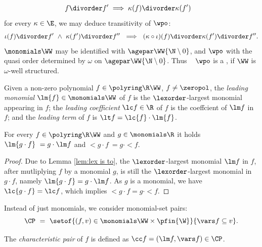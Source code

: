 \begin{align*}
f\divorder f' & \implies \kappa(f)\divorder\kappa(f') %
\end{align*}
for every $\kappa \in \E$,
we may deduce transitivity of $\wpo$: %
\[
\iota(f) \divorder f' \ \wedge \ 
\kappa(f') \divorder f'' \ \implies \ 
(\kappa\circ\iota)(f) \divorder \kappa(f') \divorder f''.
\]
$\monomials \WW$ may be identified with $\agepar \WW {\N\setminus 0}$, and $\wpo$ with the 
quasi order determined by $\omega$ on 
$\agepar \WW {\N\setminus 0}$.
Thus 
%
~%
$\wpo$ is a \wqo, if $\WW$ is $\omega$-well structured.
%
%
\begin{definition}%
\label{def:lm} 
\rm
Given a non-zero polynomial $f \in \polyring \R \WW$, $f\neq\zeropol$, the \emph{leading monomial} 
$\lm{f} \in \monomials \WW$ of $f$
is the $\lexorder$-largest monomial appearing in $f$;
the \emph{leading coefficient} $\lc f\in \R$ of $f$ is the coeffcient of $\lm f$ in $f$; and
the \emph{leading term} of $f$ is $\lt f = \lc{f} \cdot \lm{f}$.
\end{definition}
%
\begin{lemmarep} \label{lem:ltcdot}
For every  $f\in\polyring \R \WW$ and $g\in\monomials \R$ it holds
$\lm{g \cdot f} \ = g\cdot \lm f$ and
$\lt{g \cdot f} \ = g\cdot \lt f$.
\end{lemmarep}
%
%
\begin{proof}
Due to Lemma \ref{lem:lex is to}, the $\lexorder$-largest monomial
$\lm f$ in $f$, after mutliplying $f$ by a monomial $g$, is still the $\lexorder$-largest
monomial in $g\cdot f$, namely $\lm {g\cdot f} = g\cdot \lm f$.
As $g$ is a monomial, we have $\lc {g\cdot f} = \lc f$, which implies
$\lt {g\cdot f} = g\cdot \lt f$.
\end{proof}

Instead of just monomials, we consider monomial-set pairs:
\[
\CP \ = \ \setof{(f,v) \in \monomials \WW \times \pfin {\W}}{\vars f \subseteq v}.
\]
\begin{definition}
\rm
The \emph{characteristic pair} of $f$ is defined as 
$\cc f = (\lm f, \vars f) \in \CP$.
\end{definition}

